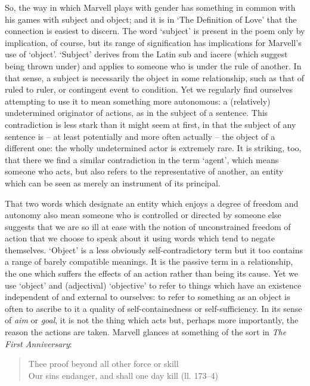 ﻿\documentclass[12pt]{article}
\newcommand{\citedtitle}[1]{\textit{#1}}
\begin{document}
So,
the way in which Marvell plays with gender has something in common with his
games with subject and object; and it is in ‘The Definition of Love’ that the
connection is easiest to discern. The word ‘subject’ is present in the poem
only by implication, of course, but its range of signification has implications
for Marvell’s use of ‘object’. ‘Subject’ derives from the Latin sub and iacere
(which suggest being thrown under) and applies to someone who is under the rule
of another. In that sense, a subject is necessarily the object in some
relationship, such as that of ruled to ruler, or contingent event to condition.
Yet we regularly find ourselves attempting to use it to mean something more
autonomous: a (relatively) undetermined originator of actions, as in the
subject of a sentence. This contradiction is less stark than it might seem at
first, in that the subject of any sentence is – at least potentially and more
often actually – the object of a different one: the wholly undetermined actor
is extremely rare. It is striking, too, that there we find a similar
contradiction in the term ‘agent’, which means someone who acts, but also
refers to the representative of another, an entity which can be seen as merely
an instrument of its principal.

That
two words which designate an entity which enjoys a degree of freedom and
autonomy also mean someone who is controlled or directed by someone else
suggests that we are so ill at ease with the notion of unconstrained freedom of
action that we choose to speak about it using words which tend to negate
themselves. ‘Object’ is a less obviously self-contradictory term but it too
contains a range of barely compatible meanings. It is the passive term in a
relationship, the one which suffers the effects of an action rather than being
its cause. Yet we use ‘object’ and (adjectival) ‘objective’ to refer to things
which have an existence independent of and external to ourselves:  to refer to
something as an object is often to ascribe to it a quality of
self-containedness or self-sufficiency. In its sense of \emph{aim} or \emph{goal}, it is not the thing
which acts but, perhaps more importantly, the reason the actions are taken.
Marvell glances at something of the sort in \citedtitle{The First Anniversary}:

\begin{verse}
Thee proof beyond all other force or skill\\
Our sins endanger, and shall one day kill (ll. 173–4)
\end{verse}
\end{document}
